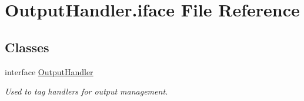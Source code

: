 \hypertarget{OutputHandler_8iface}{\section{Output\-Handler.\-iface File Reference}
\label{OutputHandler_8iface}
}
\subsection*{Classes}
\begin{DoxyCompactItemize}
\item 
interface \hyperlink{interfaceOutputHandler}{Output\-Handler}
\begin{DoxyCompactList}\small\item\em Used to tag handlers for output management. \end{DoxyCompactList}\end{DoxyCompactItemize}
